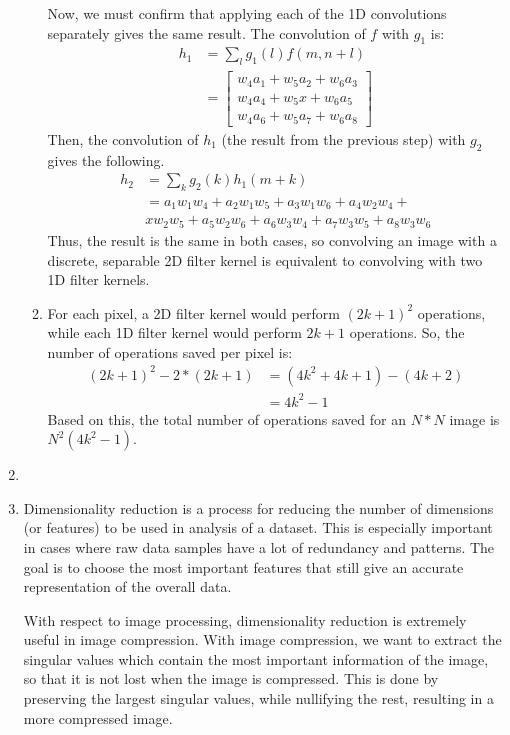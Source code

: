 \documentclass[12pt]{article}
\begin{document}
\begin{enumerate}
\begin{enumerate}
		Now, we must confirm that applying each of the 1D convolutions separately gives the same result. The convolution of $f$ with $g_1$ is:
		\begin{align*}
		h_1 &= \sum_l g_1(l) f(m, n+l) \\
		&= \begin{bmatrix}
		w_4a_1 + w_5a_2 + w_6a_3 \\
		w_4a_4 + w_5x + w_6a_5 \\
		w_4a_6 + w_5a_7 + w_6a_8
		\end{bmatrix}
		\end{align*}
		Then, the convolution of $h_1$ (the result from the previous step) with $g_2$ gives the following.
		\begin{align*}
		h_2 &= \sum_k g_2(k) h_1(m + k) \\
		&= a_1w_1w_4 + a_2w_1w_5 + a_3w_1w_6 + a_4w_2w_4 + \\ &xw_2w_5 + a_5w_2w_6 + a_6w_3w_4 + a_7w_3w_5 + a_8w_3w_6
		\end{align*}
		Thus, the result is the same in both cases, so convolving an image with a discrete, separable 2D filter kernel is equivalent to convolving with two 1D filter kernels.
		
		\item For each pixel, a 2D filter kernel would perform $(2k + 1)^2$ operations, while each 1D filter kernel would perform $2k + 1$ operations. So, the number of operations saved per pixel is:
		\begin{align*}
		(2k +1) ^2 - 2 * (2k + 1) &= (4k^2 + 4k + 1) - (4k + 2) \\
		&= 4k^2 - 1
		\end{align*}
		Based on this, the total number of operations saved for an $N*N$ image is $\boxed{N^2(4k^2 - 1)}$.
	\end{enumerate}
	\item 
	\item Dimensionality reduction is a process for reducing the number of dimensions (or features) to be used in analysis of a dataset. This is especially important in cases where raw data samples have a lot of redundancy and patterns. The goal is to choose the most important features that still give an accurate representation of the overall data.
	
	With respect to image processing, dimensionality reduction is extremely useful in image compression. With image compression, we want to extract the singular values which contain the most important information of the image, so that it is not lost when the image is compressed. This is done by preserving the largest singular values, while nullifying the rest, resulting in a more compressed image. 
	

\end{enumerate}
\end{document}
